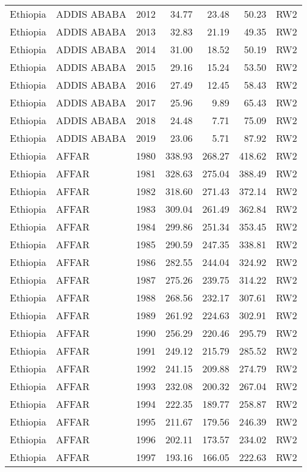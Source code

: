\begin{longtable}{lllrrrl}
  Ethiopia & ADDIS ABABA & 2012 & 34.77 & 23.48 & 50.23 & RW2 \\ 
  Ethiopia & ADDIS ABABA & 2013 & 32.83 & 21.19 & 49.35 & RW2 \\ 
  Ethiopia & ADDIS ABABA & 2014 & 31.00 & 18.52 & 50.19 & RW2 \\ 
  Ethiopia & ADDIS ABABA & 2015 & 29.16 & 15.24 & 53.50 & RW2 \\ 
  Ethiopia & ADDIS ABABA & 2016 & 27.49 & 12.45 & 58.43 & RW2 \\ 
  Ethiopia & ADDIS ABABA & 2017 & 25.96 & 9.89 & 65.43 & RW2 \\ 
  Ethiopia & ADDIS ABABA & 2018 & 24.48 & 7.71 & 75.09 & RW2 \\ 
  Ethiopia & ADDIS ABABA & 2019 & 23.06 & 5.71 & 87.92 & RW2 \\ 
  Ethiopia & AFFAR & 1980 & 338.93 & 268.27 & 418.62 & RW2 \\ 
  Ethiopia & AFFAR & 1981 & 328.63 & 275.04 & 388.49 & RW2 \\ 
  Ethiopia & AFFAR & 1982 & 318.60 & 271.43 & 372.14 & RW2 \\ 
  Ethiopia & AFFAR & 1983 & 309.04 & 261.49 & 362.84 & RW2 \\ 
  Ethiopia & AFFAR & 1984 & 299.86 & 251.34 & 353.45 & RW2 \\ 
  Ethiopia & AFFAR & 1985 & 290.59 & 247.35 & 338.81 & RW2 \\ 
  Ethiopia & AFFAR & 1986 & 282.55 & 244.04 & 324.92 & RW2 \\ 
  Ethiopia & AFFAR & 1987 & 275.26 & 239.75 & 314.22 & RW2 \\ 
  Ethiopia & AFFAR & 1988 & 268.56 & 232.17 & 307.61 & RW2 \\ 
  Ethiopia & AFFAR & 1989 & 261.92 & 224.63 & 302.91 & RW2 \\ 
  Ethiopia & AFFAR & 1990 & 256.29 & 220.46 & 295.79 & RW2 \\ 
  Ethiopia & AFFAR & 1991 & 249.12 & 215.79 & 285.52 & RW2 \\ 
  Ethiopia & AFFAR & 1992 & 241.15 & 209.88 & 274.79 & RW2 \\ 
  Ethiopia & AFFAR & 1993 & 232.08 & 200.32 & 267.04 & RW2 \\ 
  Ethiopia & AFFAR & 1994 & 222.35 & 189.77 & 258.87 & RW2 \\ 
  Ethiopia & AFFAR & 1995 & 211.67 & 179.56 & 246.39 & RW2 \\ 
  Ethiopia & AFFAR & 1996 & 202.11 & 173.57 & 234.02 & RW2 \\ 
  Ethiopia & AFFAR & 1997 & 193.16 & 166.05 & 222.63 & RW2 \\ 

\end{longtable}
